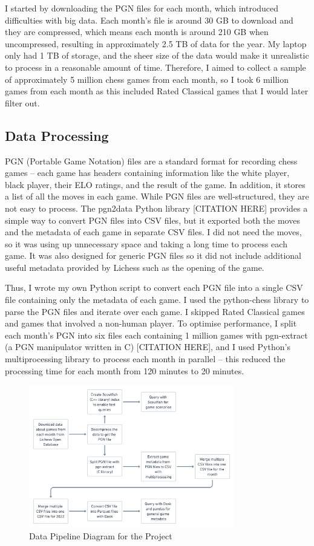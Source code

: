 \documentclass[a4paper, 11pt]{article}
\begin{document}
I started by downloading the PGN files for each month, which introduced difficulties with big data. Each month's file is around 30 GB to download and they are compressed, which means each month is around 210 GB when uncompressed, resulting in approximately 2.5 TB of data for the year. My laptop only had 1 TB of storage, and the sheer size of the data would make it unrealistic to process in a reasonable amount of time. Therefore, I aimed to collect a sample of approximately 5 million chess games from each month, so I took 6 million games from each month as this included Rated Classical games that I would later filter out.

\subsection{Data Processing}
PGN (Portable Game Notation) files are a standard format for recording chess games -- each game has headers containing information like the white player, black player, their ELO ratings, and the result of the game. In addition, it stores a list of all the moves in each game. While PGN files are well-structured, they are not easy to process. The pgn2data Python library [CITATION HERE] provides a simple way to convert PGN files into CSV files, but it exported both the moves and the metadata of each game in separate CSV files. I did not need the moves, so it was using up unnecessary space and taking a long time to process each game. It was also designed for generic PGN files so it did not include additional useful metadata provided by Lichess such as the opening of the game.

Thus, I wrote my own Python script to convert each PGN file into a single CSV file containing only the metadata of each game. I used the python-chess library to parse the PGN files and iterate over each game. I skipped Rated Classical games and games that involved a non-human player. To optimise performance, I split each month's PGN into six files each containing 1 million games with pgn-extract (a PGN manipulator written in C) [CITATION HERE], and I used Python's multiprocessing library to process each month in parallel -- this reduced the processing time for each month from 120 minutes to 20 minutes.

\begin{figure}[H]
    \centering
    \caption{Data Pipeline Diagram for the Project}
    \includegraphics[width=0.8\textwidth]{Data Pipeline.png}
\end{figure}
\end{document}
